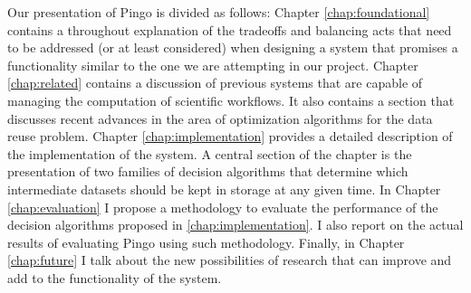 Our presentation of Pingo is divided as follows: Chapter \ref{chap:foundational} contains a throughout explanation of the tradeoffs and balancing acts that need to be addressed (or at least considered) when designing a system that promises a functionality similar to the one we are attempting in our project. Chapter \ref{chap:related} contains a discussion of previous systems that are capable of managing the computation of scientific workflows.  It also contains a section that discusses recent advances in the area of optimization algorithms for the data reuse problem. Chapter \ref{chap:implementation} provides a detailed description of the implementation of the system.  A central section of the chapter is the presentation of two families of decision algorithms that determine which intermediate datasets should be kept in storage at any given time. In Chapter \ref{chap:evaluation} I propose a methodology to evaluate the performance of the decision algorithms proposed in \ref{chap:implementation}.  I also report on the actual results of evaluating Pingo using such methodology.  Finally, in Chapter \ref{chap:future} I talk about the new possibilities of research that can improve and add to the functionality of the system.